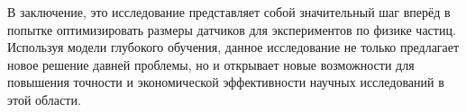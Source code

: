 \documentclass[a4paper,12pt]{extarticle}
\begin{document}
В заключение, это исследование представляет собой значительный шаг вперёд в попытке оптимизировать размеры датчиков для экспериментов по физике частиц. Используя модели глубокого обучения, данное исследование не только предлагает новое решение давней проблемы, но и открывает новые возможности для повышения точности и экономической эффективности научных исследований в этой области.


\newpage 
\printbibliography[heading=bibintoc] 

	
	
\end{document}
